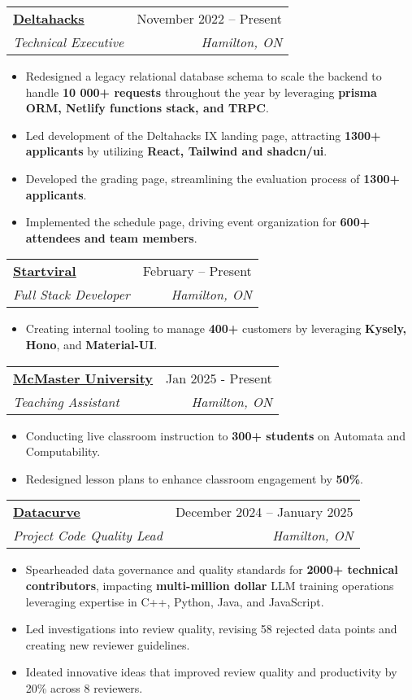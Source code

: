\documentclass[letterpaper,11pt]{article}
\makeatletter
\newcommand{\resumeItem}[1]{
  \item\small{
    {#1 \vspace{-2pt}}
  }
}
\newcommand{\resumeSubheading}[4]{
  \vspace{-2pt}\item
    \begin{tabular*}{0.97\textwidth}[t]{l@{\extracolsep{\fill}}r}
      \textbf{#1} & #2 \\
      \textit{\small#3} & \textit{\small #4} \\
    \end{tabular*}\vspace{-7pt}
}
\newcommand{\resumeItemListStart}{\begin{itemize}}
\newcommand{\resumeItemListEnd}{\end{itemize}\vspace{-5pt}}
\makeatother
\begin{document}
\resumeSubheading
{\href{https://deltahacks.com/}{\underline{Deltahacks}}}{November 2022 -- Present}
{Technical Executive}{Hamilton, ON}
\resumeItemListStart
\resumeItem{Redesigned a legacy relational database schema to scale the backend to handle \textbf{10 000+ requests} throughout the year by leveraging \textbf{prisma ORM, Netlify functions stack, and TRPC}.}
\resumeItem{Led development of the Deltahacks IX landing page, attracting \textbf{1300+ applicants} by utilizing \textbf{React, Tailwind and shadcn/ui}.}
\resumeItem{Developed the grading page, streamlining the evaluation process of \textbf{1300+ applicants}.}
\resumeItem{Implemented the schedule page, driving event organization for \textbf{600+ attendees and team members}.}
\resumeItemListEnd

\resumeSubheading
{\href{https://startviral.de/}{\underline{Startviral}}}{February -- Present}
{Full Stack Developer}{Hamilton, ON}
\resumeItemListStart
\resumeItem{Creating internal tooling to manage \textbf{400+} customers by leveraging \textbf{Kysely, Hono}, and \textbf{Material-UI}.}
\resumeItemListEnd

\resumeSubheading
{\href{https://www.mcmaster.ca/}{\underline{McMaster University}}}{Jan 2025 - Present}
{Teaching Assistant}{Hamilton, ON}
\resumeItemListStart
\resumeItem{Conducting live classroom instruction to \textbf{300+ students} on Automata and Computability.}
\resumeItem{Redesigned lesson plans to enhance classroom engagement by \textbf{50\%}.}
\resumeItemListEnd

\resumeSubheading
{\href{https://datacurve.ai/}{\underline{Datacurve}}}{December 2024 -- January 2025}
{Project Code Quality Lead}{Hamilton, ON}
\resumeItemListStart
\resumeItem{Spearheaded data governance and quality standards for \textbf{2000+ technical contributors}, impacting \textbf{multi-million dollar} LLM training operations leveraging expertise in C++, Python, Java, and JavaScript.}
\resumeItem{Led investigations into review quality, revising 58 rejected data points and creating new reviewer guidelines.}
\resumeItem{Ideated innovative ideas that improved review quality and productivity by 20\% across 8 reviewers.}
\resumeItemListEnd

\end{document}
